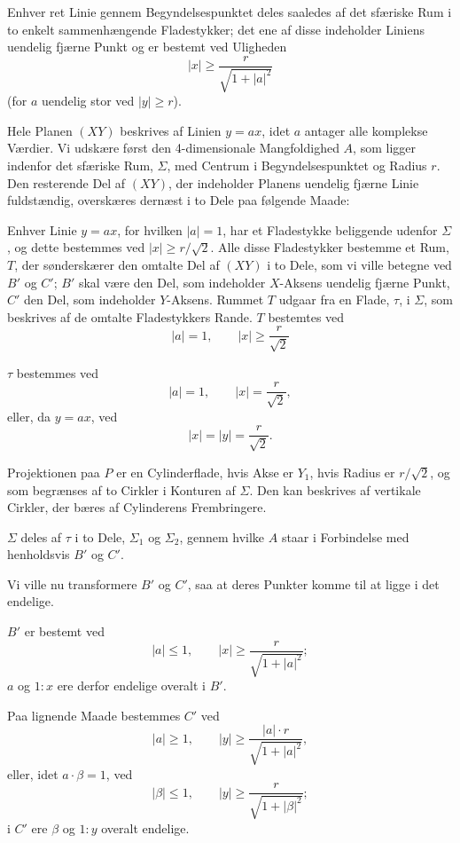 \documentclass{article}
\begin{document}
Enhver ret Linie gennem Begyndelsespunktet deles saaledes af det sfæriske Rum i to enkelt sammenhængende Fladestykker; det ene af disse indeholder Liniens uendelig fjærne Punkt og er bestemt ved Uligheden
\[
|x| \ge \frac{r}{\sqrt{1 + |a|^2}}
\]
(for $a$ uendelig stor ved $|y| \ge r$).

Hele Planen $(XY)$ beskrives af Linien $y = ax$, idet $a$ antager alle komplekse Værdier. Vi udskære først den 4-dimensionale Mangfoldighed $A$, som ligger indenfor det sfæriske Rum, $\Sigma$, med Centrum i Begyndelsespunktet og Radius $r$. Den resterende Del af $(XY)$, der indeholder Planens uendelig fjærne Linie fuldstændig, overskæres dernæst i to Dele paa følgende Maade:

Enhver Linie $y = ax$, for hvilken $|a| = 1$, har et Fladestykke beliggende udenfor $\Sigma$, og dette bestemmes ved $|x| \ge r / \sqrt{2}$. Alle disse Fladestykker bestemme et Rum, $T$, der sønderskærer den omtalte Del af $(XY)$ i to Dele, som vi ville betegne ved $B'$ og $C'$; $B'$ skal være den Del, som indeholder $X$-Aksens uendelig fjærne Punkt, $C'$ den Del, som indeholder $Y$-Aksens. Rummet $T$ udgaar fra en Flade, $\tau$, i $\Sigma$, som beskrives af de omtalte Fladestykkers Rande. $T$ bestemtes ved
\[
|a| = 1, \qquad |x| \ge \frac{r}{\sqrt{2}}
\]

$\tau$ bestemmes ved
\[
|a| = 1, \qquad |x| = \frac{r}{\sqrt{2}},
\]
eller, da $y = ax$, ved
\[
|x| = |y| = \frac{r}{\sqrt{2}}.
\]

Projektionen paa $P$ er en Cylinderflade, hvis Akse er $Y_1$, hvis Radius er $r / \sqrt{2}$, og som begrænses af to Cirkler i Konturen af $\Sigma$. Den kan beskrives af vertikale Cirkler, der bæres af Cylinderens Frembringere.

$\Sigma$ deles af $\tau$ i to Dele, $\Sigma_1$ og $\Sigma_2$, gennem hvilke $A$ staar i Forbindelse med henholdsvis $B'$ og $C'$.

Vi ville nu transformere $B'$ og $C'$, saa at deres Punkter komme til at ligge i det endelige.

$B'$ er bestemt ved
\[
|a| \le 1, \qquad |x| \ge \frac{r}{\sqrt{1 + |a|^2}}; \tag{1}
\]
$a$ og $1 : x$ ere derfor endelige overalt i $B'$.

Paa lignende Maade bestemmes $C'$ ved
\[
|a| \ge 1, \qquad |y| \ge \frac{|a| \cdot r}{\sqrt{1 + |a|^2}},
\]
eller, idet $a \cdot \beta = 1$, ved
\[
|\beta| \le 1, \qquad |y| \ge \frac{r}{\sqrt{1 + |\beta|^2}}; \tag{2}
\]
i $C'$ ere $\beta$ og $1 : y$ overalt endelige.
\end{document}
